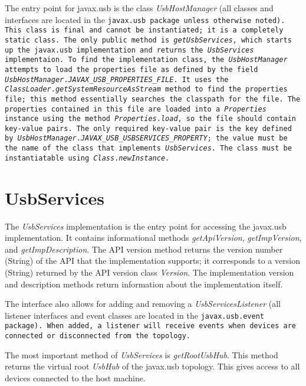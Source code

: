 \documentclass{article}
\newcommand{\myclass}[1]{\emph{#1}}
\newcommand{\myinterface}[1]{\emph{#1}}
\newcommand{\mypackage}[1]{\tt#1\rm}
\newcommand{\mymethod}[1]{\emph{#1}}
\newcommand{\myfield}[1]{\emph{#1}}
\newcommand{\mysectionend}[0]{\vfill\pagebreak[1]}
\begin{document}
The entry point for javax.usb is the class \myclass{UsbHostManager} (all classes and interfaces
are located in the \mypackage{javax.usb} package unless otherwise noted).  This class
is final and cannot be instantiated; it is a completely static class.  The only
public method is \mymethod{getUsbServices}, which starts up the javax.usb implementation
and returns the \myinterface{UsbServices} implementaion.  To find the implementation class,
the \myclass{UsbHostManager} attempts to load the properties file as defined by the
field \myclass{UsbHostManager}.\myfield{JAVAX\_USB\_PROPERTIES\_FILE}.  It uses the
\myclass{ClassLoader}.\mymethod{getSystemResourceAsStream} method to find the properties file;
this method essentially searches the classpath for the file.  The properties contained
in this file are loaded into a \myclass{Properties} instance using the method
\myclass{Properties}.\mymethod{load}, so the file should contain key-value pairs.  The
only required key-value pair is the key defined by
\myclass{UsbHostManager}.\myfield{JAVAX\_USB\_USBSERVICES\_PROPERTY}; the value must be the
name of the class that implements \myinterface{UsbServices}.  The class must be instantiatable
using \myclass{Class}.\mymethod{newInstance}.

\mysectionend

%

\section{UsbServices}

The \myinterface{UsbServices} implementation is the entry point for accessing the
javax.usb implementation.  It contains informational methods \mymethod{getApiVersion},
\mymethod{getImpVersion}, and \mymethod{getImpDescription}.  The API version method
returns the version number (String) of the API that the implementation supports; it
corresponds to a version (String) returned by the API version class \myclass{Version}.
The implementation version and description methods return information about the
implementation itself.

The interface also allows for adding and removing a \myinterface{UsbServicesListener}
(all listener interfaces and event classes are located in the \mypackage{javax.usb.event} package).
When added, a listener will receive events when devices are connected or disconnected from the
topology.

The most important method of \myinterface{UsbServices} is \mymethod{getRootUsbHub}.
This method returns the virtual root \myinterface{UsbHub} of the javax.usb topology.  This gives access
to all devices connected to the host machine.
\end{document}
